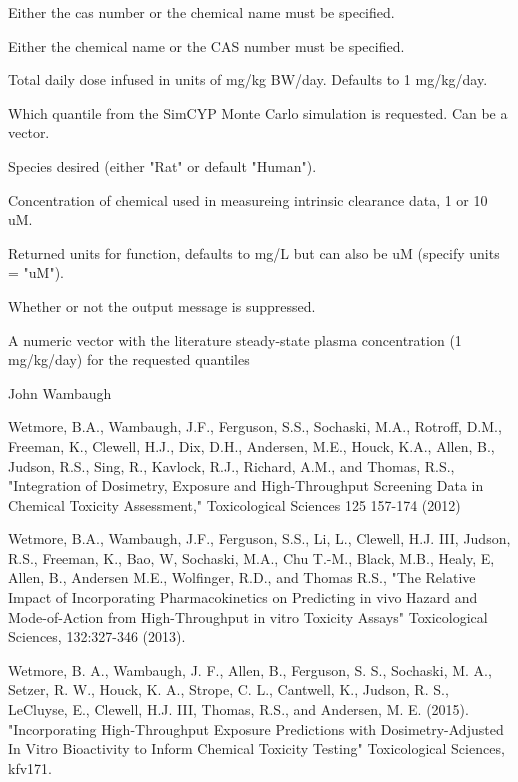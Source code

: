 \documentclass[a4paper]{book}
\begin{document}
%
\begin{Arguments}
\begin{ldescription}
\item[\code{chem.cas}] Either the cas number or the chemical name must be
specified.

\item[\code{chem.name}] Either the chemical name or the CAS number must be
specified.

\item[\code{daily.dose}] Total daily dose infused in units of mg/kg BW/day.
Defaults to 1 mg/kg/day.

\item[\code{which.quantile}] Which quantile from the SimCYP Monte Carlo simulation
is requested. Can be a vector.

\item[\code{species}] Species desired (either "Rat" or default "Human").

\item[\code{clearance.assay.conc}] Concentration of chemical used in measureing
intrinsic clearance data, 1 or 10 uM.

\item[\code{output.units}] Returned units for function, defaults to mg/L but can
also be uM (specify units = "uM").

\item[\code{suppress.messages}] Whether or not the output message is suppressed.
\end{ldescription}
\end{Arguments}
%
\begin{Value}
A numeric vector with the literature steady-state plasma 
concentration (1 mg/kg/day) for the requested quantiles
\end{Value}
%
\begin{Author}\relax
John Wambaugh
\end{Author}
%
\begin{References}\relax
Wetmore, B.A., Wambaugh, J.F., Ferguson, S.S., Sochaski, M.A.,
Rotroff, D.M., Freeman, K., Clewell, H.J., Dix, D.H., Andersen, M.E., Houck,
K.A., Allen, B., Judson, R.S., Sing, R., Kavlock, R.J., Richard, A.M., and
Thomas, R.S., "Integration of Dosimetry, Exposure and High-Throughput
Screening Data in Chemical Toxicity Assessment," Toxicological Sciences 125
157-174 (2012)

Wetmore, B.A., Wambaugh, J.F., Ferguson, S.S., Li, L., Clewell, H.J. III,
Judson, R.S., Freeman, K., Bao, W, Sochaski, M.A., Chu T.-M., Black, M.B.,
Healy, E, Allen, B., Andersen M.E., Wolfinger, R.D., and Thomas R.S., "The
Relative Impact of Incorporating Pharmacokinetics on Predicting in vivo
Hazard and Mode-of-Action from High-Throughput in vitro Toxicity Assays"
Toxicological Sciences, 132:327-346 (2013).

Wetmore, B. A., Wambaugh, J. F., Allen, B., Ferguson, S. S., Sochaski, M.
A., Setzer, R. W., Houck, K. A., Strope, C. L., Cantwell, K., Judson, R. S.,
LeCluyse, E., Clewell, H.J. III, Thomas, R.S., and Andersen, M. E. (2015).
"Incorporating High-Throughput Exposure Predictions with Dosimetry-Adjusted
In Vitro Bioactivity to Inform Chemical Toxicity Testing" Toxicological
Sciences, kfv171.
\end{References}
\end{document}
